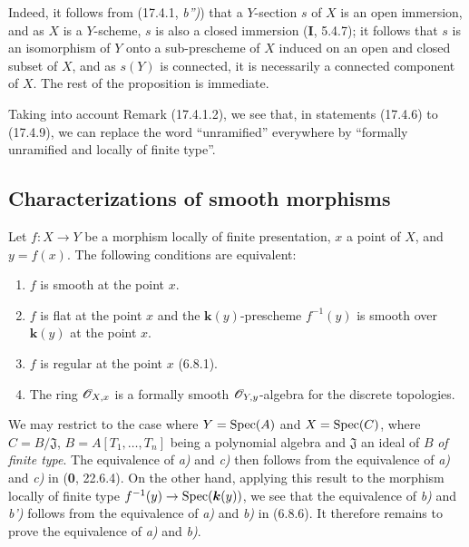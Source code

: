 Indeed, it follows from (17.4.1, \emph{b'')}) that a $Y$-section $s$ of $X$ is an open immersion, and as $X$ is a $Y$-scheme, $s$ is also a closed immersion (\textbf{I}, 5.4.7); it follows that $s$ is an isomorphism of $Y$ onto a sub-prescheme of $X$ induced on an open and closed subset of $X$, and as $s(Y)$ is connected, it is necessarily a connected component of $X$. The rest of the proposition is immediate.

\begin{remark}[17.4.10]
\label{IV.17.4.10}
Taking into account Remark (17.4.1.2), we see that, in statements (17.4.6) to (17.4.9), we can replace the word ``unramified'' everywhere by ``formally unramified and locally of finite type''.
\end{remark}


\subsection{Characterizations of smooth morphisms}

\begin{theorem}[17.5.1]
\label{IV.17.5.1}
Let $f:X\to Y$ be a morphism locally of finite presentation, $x$ a point of $X$, and $y=f(x)$. The following conditions are equivalent:
\begin{enumerate}
  \item[\textup{a)}] $f$ is smooth at the point $x$.
  \item[\textup{b)}] $f$ is flat at the point $x$ and the $\boldsymbol{k}(y)$-prescheme $f^{-1}(y)$ is smooth over $\boldsymbol{k}(y)$ at the point $x$.
  \item[\textup{b$'$)}] $f$ is regular at the point $x$ \textup{(6.8.1)}.
  \item[\textup{c)}] The ring $\mathscr{O}_{X,x}$ is a formally smooth $\mathscr{O}_{Y,y}$-algebra for the discrete topologies.
\end{enumerate}
\end{theorem}

We may restrict to the case where $Y=\operatorname{Spec}(A)$ and $X=\operatorname{Spec}(C)$, where $C=B/\mathfrak{J}$, $B=A[T_1,\ldots,T_n]$ being a polynomial algebra and $\mathfrak{J}$ an ideal of $B$ \emph{of finite type}. The equivalence of \emph{a)} and \emph{c)} then follows from the equivalence of \emph{a)} and \emph{c)} in (\textbf{0}, 22.6.4). On the other hand, applying this result to the morphism locally of finite type $f^{-1}(y)\to\operatorname{Spec}(\boldsymbol{k}(y))$, we see that the equivalence of \emph{b)} and \emph{b')} follows from the equivalence of \emph{a)} and \emph{b)} in (6.8.6). It therefore remains to prove the equivalence of \emph{a)} and \emph{b)}.

